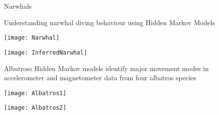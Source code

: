 \documentclass[compress,10pt]{beamer}
\begin{document}
\begin{frame}{Narwhals \cite{Ngo2019} }

Understanding narwhal diving behaviour using Hidden Markov Models


\begin{center} 
\begin{minipage}[c]{.46\linewidth}
\texttt{[image: Narwhal]}
\end{minipage} \hfill
\begin{minipage}[c]{.46\linewidth}
\texttt{[image: InferredNarwhal]}
\end{minipage}
\end{center}


\end{frame}



\begin{frame}{Albatross \cite{Conners2021}}
Hidden Markov models identify major
movement modes in accelerometer and
magnetometer data from four albatros
species
\begin{center} 
\begin{minipage}[c]{.46\linewidth}
\texttt{[image: Albatros1]}
\end{minipage} \hfill
\begin{minipage}[c]{.46\linewidth}
\texttt{[image: Albatros2]}
\end{minipage}
\end{center}

 
\end{frame}
\end{document}
